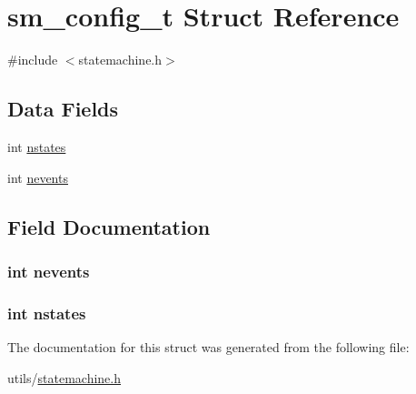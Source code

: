 \hypertarget{structsm__config__t}{\section{sm\-\_\-config\-\_\-t Struct Reference}
\label{structsm__config__t}
}


{\ttfamily \#include $<$statemachine.\-h$>$}

\subsection*{Data Fields}
\begin{DoxyCompactItemize}
\item 
int \hyperlink{structsm__config__t_a4059dce129f932da3e73c1fa8a8a7590}{nstates}
\item 
int \hyperlink{structsm__config__t_a5209ed8d981dc170e77bea159c5bbe48}{nevents}
\end{DoxyCompactItemize}


\subsection{Field Documentation}
\hypertarget{structsm__config__t_a5209ed8d981dc170e77bea159c5bbe48}{
\subsubsection[{nevents}]{\setlength{\rightskip}{0pt plus 5cm}int nevents}}\label{structsm__config__t_a5209ed8d981dc170e77bea159c5bbe48}
\hypertarget{structsm__config__t_a4059dce129f932da3e73c1fa8a8a7590}{
\subsubsection[{nstates}]{\setlength{\rightskip}{0pt plus 5cm}int nstates}}\label{structsm__config__t_a4059dce129f932da3e73c1fa8a8a7590}


The documentation for this struct was generated from the following file\-:\begin{DoxyCompactItemize}
\item 
utils/\hyperlink{statemachine_8h}{statemachine.\-h}\end{DoxyCompactItemize}
